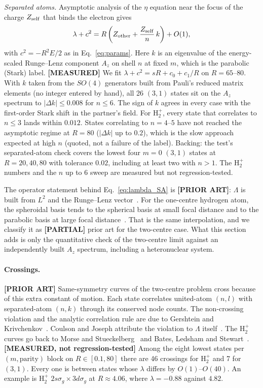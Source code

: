 \documentclass[aps,pra,twocolumn,superscriptaddress,longbibliography]{revtex4-2}
\begin{document}
\emph{Separated atoms.} Asymptotic analysis of the $\eta$ equation near
the focus of the charge $Z_{\rm self}$ that binds the electron gives
\begin{equation}
  \lambda + c^2 = R\left(Z_{\rm other} + \frac{Z_{\rm self}}{n}\,k\right)
                 + O(1),
  \label{eq:lambda_SA}
\end{equation}
with $c^2 = -R^2E/2$ as in Eq.~\eqref{eq:params}. Here $k$ is an
eigenvalue of the energy-scaled Runge--Lenz component $A_z$ on shell $n$
at fixed $m$, which is the parabolic (Stark) label. \textbf{[MEASURED]}
We fit $\lambda + c^2 = sR + c_0 + c_1/R$ on $R = 65$--$80$. With $k$
taken from the $SO(4)$ generators built from Pauli's reduced matrix
elements (no integer entered by hand), all 26 $(3,1)$ states sit on the
$A_z$ spectrum to $|\Delta k|\le 0.008$ for $n\le6$. The sign of $k$
agrees in every case with the first-order Stark shift in the partner's
field. For H$_2^+$, every state that correlates to $n\le3$ lands within
$0.012$. States correlating to $n = 4$--$5$ have not reached the
asymptotic regime at $R = 80$ ($|\Delta k|$ up to $0.2$), which is the
slow approach expected at high $n$ (quoted, not a failure of the label).
Backing: the test's separated-atom check covers the lowest four $m = 0$
$(3,1)$ states at $R = 20, 40, 80$ with tolerance $0.02$, including at
least two with $n > 1$. The H$_2^+$ numbers and the $n$ up to 6 sweep
are measured but not regression-tested.

The operator statement behind Eq.~\eqref{eq:lambda_SA} is
\textbf{[PRIOR ART]}: $\Lambda$ is built from $L^2$ and the Runge--Lenz
vector~\cite{CoulsonJoseph1967,KPS1976}. For the one-centre hydrogen
atom, the spheroidal basis tends to the spherical basis at small focal
distance and to the parabolic basis at large focal
distance~\cite{Mardoyan1985}. That is the same interpolation, and we
classify it as \textbf{[PARTIAL]} prior art for the two-centre case. What
this section adds is only the quantitative check of the two-centre limit
against an independently built $A_z$ spectrum, including a heteronuclear
system.

\paragraph{Crossings.} \textbf{[PRIOR ART]} Same-symmetry curves of the
two-centre problem cross because of this extra constant of motion. Each
state correlates united-atom $(n,l)$ with separated-atom $(n,k)$ through
its conserved node counts. The non-crossing violation and the analytic
correlation rule are due to Gershtein and Krivchenkov~\cite{GK1961}.
Coulson and Joseph attribute the violation to $\Lambda$
itself~\cite{CoulsonJoseph1967}. The H$_2^+$ curves go back to Morse and
Stueckelberg~\cite{MorseStueckelberg1929} and Bates, Ledsham and
Stewart~\cite{Bates1953}. \textbf{[MEASURED, not regression-tested]}
Among the eight lowest states per $(m,\text{parity})$ block on
$R\in[0.1,80]$ there are 46 crossings for H$_2^+$ and 7 for $(3,1)$.
Every one is between states whose $\lambda$ differs by $O(1)$--$O(40)$.
An example is H$_2^+$ $2s\sigma_g\times3d\sigma_g$ at $R\approx4.06$,
where $\lambda = -0.88$ against $4.82$.
\end{document}
